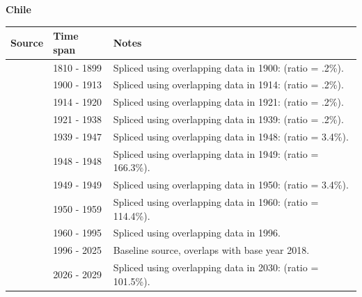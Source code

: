 \documentclass[12pt,a4paper,landscape]{article}
\begin{document}
\begin{adjustbox}{max totalsize={\paperwidth}{\paperheight},center}
\begin{minipage}[t][\textheight][t]{\textwidth}
\vspace*{0.5cm}
{}
\begin{center}
{\Large\bfseries Chile}
\end{center}
\vspace{0.5cm}
\begin{table}[H]
\centering
\small
\begin{tabular}{|l|l|l|}
\hline
\textbf{Source} & \textbf{Time span} & \textbf{Notes} \\
\hline
\rowcolor{white}\cite{Tena}& 1810 - 1899 &Spliced using overlapping data in 1900: (ratio = .2\%).\\
\rowcolor{lightgray}\cite{UN_trade}& 1900 - 1913 &Spliced using overlapping data in 1914: (ratio = .2\%).\\
\rowcolor{white}\cite{Tena}& 1914 - 1920 &Spliced using overlapping data in 1921: (ratio = .2\%).\\
\rowcolor{lightgray}\cite{UN_trade}& 1921 - 1938 &Spliced using overlapping data in 1939: (ratio = .2\%).\\
\rowcolor{white}\cite{Mitchell}& 1939 - 1947 &Spliced using overlapping data in 1948: (ratio = 3.4\%).\\
\rowcolor{lightgray}\cite{UN_trade}& 1948 - 1948 &Spliced using overlapping data in 1949: (ratio = 166.3\%).\\
\rowcolor{white}\cite{Mitchell}& 1949 - 1949 &Spliced using overlapping data in 1950: (ratio = 3.4\%).\\
\rowcolor{lightgray}\cite{UN_trade}& 1950 - 1959 &Spliced using overlapping data in 1960: (ratio = 114.4\%).\\
\rowcolor{white}\cite{WDI}& 1960 - 1995 &Spliced using overlapping data in 1996.\\
\rowcolor{lightgray}\cite{OECD_EO}& 1996 - 2025 &Baseline source, overlaps with base year 2018.\\
\rowcolor{white}\cite{IMF_WEO_forecast}& 2026 - 2029 &Spliced using overlapping data in 2030: (ratio = 101.5\%).\\
\hline
\end{tabular}
\end{table}
\begin{figure}[H]
\centering

\end{figure}
\end{minipage}
\end{adjustbox}
\end{document}
